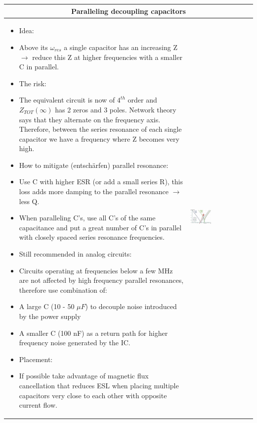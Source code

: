 \begin{table}[h!]
\begin{tabular}{|m{}|m{}|}
			\\	
			\hline
				\multicolumn{2}{c}{\textbf{Paralleling decoupling capacitors}}
			\\
			\hline
				\begin{itemize}
					\item Idea: 
					\setlength{\itemsep}{-4pt}
					\item[] Above its $\omega_{res}$ a single capacitor has an increasing Z $\rightarrow$ reduce this Z at higher frequencies with a smaller C in parallel. 
					\item The risk: 
					\setlength{\itemsep}{-4pt}
					\item[]The equivalent circuit is now of $4^{th}$ order and $Z_{TOT}(\infty)$ has 2 zeros and 3 poles. Network theory says that they alternate on the frequency axis. Therefore, between the series resonance of each single capacitor we have a frequency where Z becomes very high. 
					\setlength{\itemsep}{0pt}
					\item How to mitigate (entschärfen) parallel resonance: 
					\setlength{\itemsep}{-4pt}
					\item[] Use C with higher ESR (or add a small series R), this loss adds more damping to the parallel resonance $\rightarrow$ less Q. 
					\item[] When paralleling C's, use all C's of the same capacitance and put a great number of C's in parallel with closely spaced series resonance frequencies. 
					\setlength{\itemsep}{0pt}
					\item Still recommended in analog circuits: 
					\setlength{\itemsep}{-4pt}
					\item[] Circuits operating at frequencies below a few MHz are not affected by high frequency parallel resonances, therefore use combination of: 
					\item[] A large C (10 - 50 $\mu F$) to decouple noise introduced by the power supply
					\item[] A smaller C (100 nF) as a return path for higher frequency noise generated by the IC. 
					\setlength{\itemsep}{0pt}
					\item Placement: 
					\setlength{\itemsep}{-4pt}
					\item[] If possible take advantage of magnetic flux cancellation that reduces ESL when placing multiple capacitors very close to each other with opposite current flow. 
				\end{itemize}
			& 
					\begin{center}\includegraphics[width=0.35\textwidth]{images/ParallelC.png}\end{center}  

\end{tabular}
\end{table}
